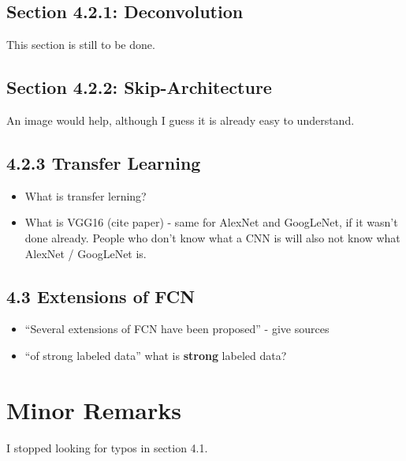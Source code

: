 \documentclass[a4paper,9pt]{scrartcl}
\begin{document}
\subsection{Section 4.2.1: Deconvolution}
This section is still to be done.


\subsection{Section 4.2.2: Skip-Architecture}
An image would help, although I guess it is already easy to understand.


\subsection{4.2.3 Transfer Learning}
\begin{itemize}
    \item What is transfer lerning?
    \item What is VGG16 (cite paper) - same for AlexNet and GoogLeNet, if it
          wasn't done already. People who don't know what a CNN is will also
          not know what AlexNet / GoogLeNet is.
\end{itemize}


\subsection{4.3 Extensions of FCN}
\begin{itemize}
    \item \enquote{Several extensions of FCN have been proposed} - give sources
    \item \enquote{of strong labeled data} what is \textbf{strong} labeled data?
\end{itemize}


\section{Minor Remarks}
I stopped looking for typos in section 4.1.
\end{document}
